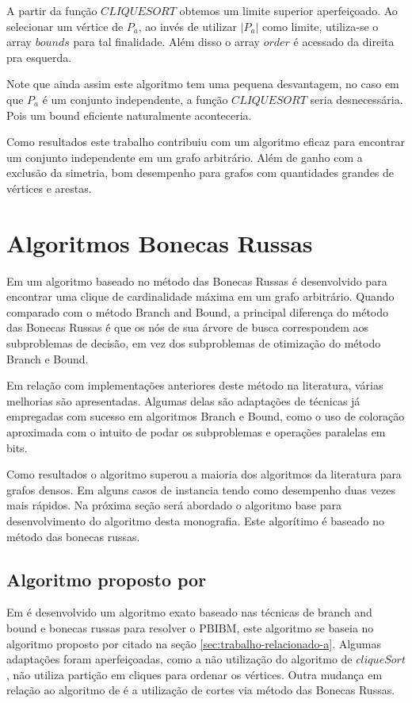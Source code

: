  A partir da função $CLIQUESORT$ obtemos um limite superior aperfeiçoado. Ao selecionar um vértice de $P_a$, ao invés de utilizar $|P_a|$ como limite, utiliza-se o array $bounds$ para tal finalidade. Além disso o array $order$ é acessado da direita pra esquerda.
 
 Note que ainda assim este algoritmo tem uma pequena desvantagem, no caso em que $P_a$ é um conjunto independente, a função $CLIQUESORT$ seria desnecessária. Pois um bound eficiente naturalmente aconteceria.
 
Como resultados este trabalho contribuiu com um algoritmo eficaz para encontrar um 
conjunto independente em um grafo arbitrário. Além de ganho com a exclusão da 
simetria, bom desempenho para grafos com quantidades grandes de vértices e arestas.
    

\section{Algoritmos Bonecas Russas}
\label{sec:trabalho-relacionado-b}

Em  um algoritmo baseado no método das Bonecas Russas é desenvolvido para encontrar uma clique de cardinalidade máxima em um grafo arbitrário. 
Quando comparado com o método Branch and Bound, a principal diferença do método das Bonecas Russas é que os nós de sua árvore de busca correspondem aos subproblemas de decisão, em vez dos subproblemas de otimização do método Branch e Bound.

Em relação com implementações anteriores deste método na literatura, várias melhorias são apresentadas. Algumas delas são adaptações de técnicas já empregadas com sucesso em algoritmos Branch e Bound, como o uso de coloração aproximada com o intuito de podar os subproblemas e operações paralelas em bits.

Como resultados o algoritmo superou a maioria dos algoritmos da literatura para grafos densos. Em alguns casos de instancia tendo como desempenho duas vezes mais rápidos.
Na próxima seção será abordado o algoritmo base para desenvolvimento do algoritmo desta monografia. Este algorítimo é baseado no método das bonecas russas.

 \subsection{Algoritmo proposto por  \label{sec:proposta2}}
 
     Em  é desenvolvido um algoritmo exato baseado nas técnicas de
    branch and bound e bonecas russas para resolver o \acrshort{PBIBM}, este algoritmo se baseia no algoritmo proposto por 
     citado na seção \ref{sec:trabalho-relacionado-a}. 
    Algumas adaptações foram aperfeiçoadas, como a  não utilização do algoritmo de 
    $cliqueSort$, 
    não utiliza partição em cliques para ordenar os vértices. Outra mudança em relação 
    ao algoritmo de  é a utilização de cortes via método das  
    Bonecas Russas.
    
